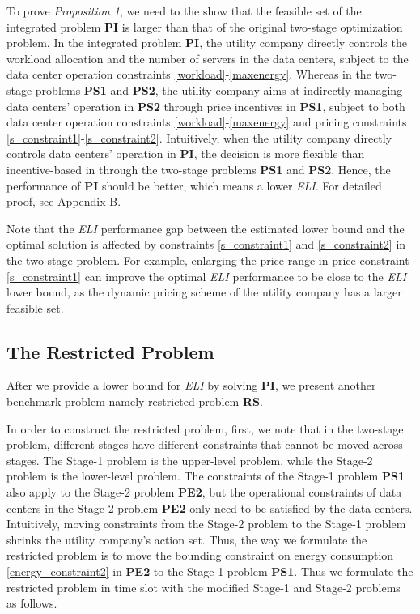\documentclass[journal]{IEEEtran}
\begin{document}
	To prove \emph{Proposition 1}, we need to the show that the feasible set of the integrated problem \textbf{PI} is larger than that of the original two-stage optimization problem. In the integrated problem \textbf{PI}, the utility company directly controls the workload allocation and the number of servers in the data centers, subject to the data center operation constraints \eqref{workload}-\eqref{maxenergy}. Whereas in the two-stage problems \textbf{PS1} and \textbf{PS2}, the utility company aims at indirectly managing data centers' operation in \textbf{PS2} through price incentives in \textbf{PS1}, subject to both data center operation constraints \eqref{workload}-\eqref{maxenergy} and pricing constraints \eqref{s_constraint1}-\eqref{s_constraint2}. Intuitively, when the utility company directly controls data centers' operation in \textbf{PI}, the decision is more flexible than incentive-based in through the two-stage problems \textbf{PS1} and \textbf{PS2}. Hence, the performance of \textbf{PI} should be better, which means a lower \emph{ELI}. For detailed proof, see Appendix B.
	
	Note that the \emph{ELI} performance gap between the estimated lower bound and the optimal solution is affected by constraints \eqref{s_constraint1} and \eqref{s_constraint2} in the two-stage problem. For example, enlarging the price range  in price constraint \eqref{s_constraint1} can improve the optimal \emph{ELI} performance to be close to the \emph{ELI} lower bound, as the dynamic pricing scheme of the utility company has a larger feasible set.

	\subsection{The Restricted Problem}
	After we provide a lower bound for \emph{ELI} by solving \textbf{PI}, we present another benchmark problem namely restricted problem \textbf{RS}. 
	
	In order to construct the restricted problem, first, we note that in the two-stage problem, different stages have different constraints that cannot be moved across stages. The Stage-1 problem is the upper-level problem, while the Stage-2 problem is the lower-level problem. The constraints of the Stage-1 problem \textbf{PS1} also apply to the Stage-2 problem \textbf{PE2}, but the operational constraints of data centers in the Stage-2 problem \textbf{PE2} only need to be satisfied by the data centers. Intuitively, moving constraints from the Stage-2 problem to the Stage-1 problem shrinks the utility company's action set. Thus, the way we formulate the restricted problem is to move the bounding constraint on energy consumption \eqref{energy_constraint2} in \textbf{PE2} to the Stage-1 problem \textbf{PS1}. Thus we formulate the restricted problem in time slot  with the modified Stage-1 and Stage-2 problems as follows. 
	
\end{document}
